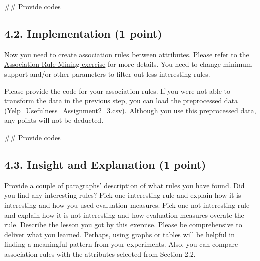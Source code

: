 \documentclass[
  letterpaper,
]{scrbook}
\newenvironment{Shaded}{\begin{snugshade}}{\end{snugshade}}
\newcommand{\CommentTok}[1]{\textcolor[rgb]{0.37,0.37,0.37}{#1}}
\begin{document}
\begin{Shaded}
\begin{Highlighting}[]
\CommentTok{\#\# Provide codes}
\end{Highlighting}
\end{Shaded}

\subsection*{4.2. Implementation (1
point)}\label{implementation-1-point}

Now you need to create association rules between attributes. Please
refer to the
\href{../demo/python_association_rule_mining.html}{Association Rule
Mining exercise} for more details. You need to change minimum support
and/or other parameters to filter out less interesting rules.

Please provide the code for your association rules. If you were not able
to transform the data in the previous step, you can load the
preprocessed data
(\href{../data/Yelp_Usefulness_Assignment2_3.csv}{Yelp\_Usefulness\_Assignment2\_3.csv}).
Although you use this preprocessed data, any points will not be
deducted.

\begin{Shaded}
\begin{Highlighting}[]
\CommentTok{\#\# Provide codes}
\end{Highlighting}
\end{Shaded}

\subsection*{4.3. Insight and Explanation (1
point)}\label{insight-and-explanation-1-point}

Provide a couple of paragraphs' description of what rules you have
found. Did you find any interesting rules? Pick one interesting rule and
explain how it is interesting and how you used evaluation measures. Pick
one not-interesting rule and explain how it is not interesting and how
evaluation measures overate the rule. Describe the lesson you got by
this exercise. Please be comprehensive to deliver what you learned.
Perhaps, using graphs or tables will be helpful in finding a meaningful
pattern from your experiments. Also, you can compare association rules
with the attributes selected from Section 2.2.
\end{document}
